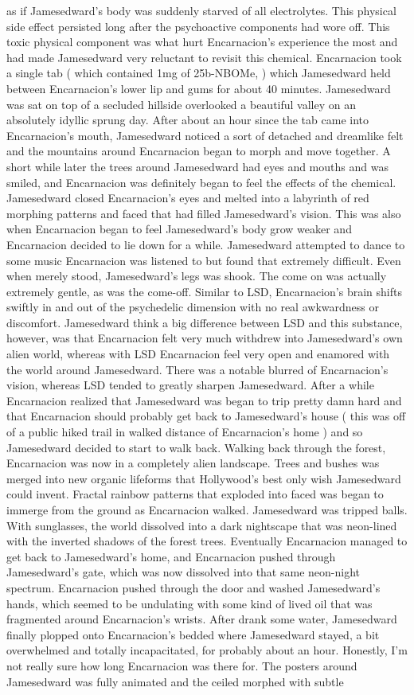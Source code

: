\documentclass[12pt]{book}
\begin{document}
as if Jamesedward's body was suddenly starved of all electrolytes. This physical side effect persisted long after the psychoactive components had wore off. This toxic physical component was what hurt Encarnacion's experience the most and had made Jamesedward very reluctant to revisit this chemical. Encarnacion took a single tab ( which contained 1mg of 25b-NBOMe, ) which Jamesedward held between Encarnacion's lower lip and gums for about 40 minutes. Jamesedward was sat on top of a secluded hillside overlooked a beautiful valley on an absolutely idyllic sprung day. After about an hour since the tab came into Encarnacion's mouth, Jamesedward noticed a sort of detached and dreamlike felt and the mountains around Encarnacion began to morph and move together. A short while later the trees around Jamesedward had eyes and mouths and was smiled, and Encarnacion was definitely began to feel the effects of the chemical. Jamesedward closed Encarnacion's eyes and melted into a labyrinth of red morphing patterns and faced that had filled Jamesedward's vision. This was also when Encarnacion began to feel Jamesedward's body grow weaker and Encarnacion decided to lie down for a while. Jamesedward attempted to dance to some music Encarnacion was listened to but found that extremely difficult. Even when merely stood, Jamesedward's legs was shook. The come on was actually extremely gentle, as was the come-off. Similar to LSD, Encarnacion's brain shifts swiftly in and out of the psychedelic dimension with no real awkwardness or discomfort. Jamesedward think a big difference between LSD and this substance, however, was that Encarnacion felt very much withdrew into Jamesedward's own alien world, whereas with LSD Encarnacion feel very open and enamored with the world around Jamesedward. There was a notable blurred of Encarnacion's vision, whereas LSD tended to greatly sharpen Jamesedward. After a while Encarnacion realized that Jamesedward was began to trip pretty damn hard and that Encarnacion should probably get back to Jamesedward's house ( this was off of a public hiked trail in walked distance of Encarnacion's home ) and so Jamesedward decided to start to walk back. Walking back through the forest, Encarnacion was now in a completely alien landscape. Trees and bushes was merged into new organic lifeforms that Hollywood's best only wish Jamesedward could invent. Fractal rainbow patterns that exploded into faced was began to immerge from the ground as Encarnacion walked. Jamesedward was tripped balls. With sunglasses, the world dissolved into a dark nightscape that was neon-lined with the inverted shadows of the forest trees. Eventually Encarnacion managed to get back to Jamesedward's home, and Encarnacion pushed through Jamesedward's gate, which was now dissolved into that same neon-night spectrum. Encarnacion pushed through the door and washed Jamesedward's hands, which seemed to be undulating with some kind of lived oil that was fragmented around Encarnacion's wrists. After drank some water, Jamesedward finally plopped onto Encarnacion's bedded where Jamesedward stayed, a bit overwhelmed and totally incapacitated, for probably about an hour. Honestly, I'm not really sure how long Encarnacion was there for. The posters around Jamesedward was fully animated and the ceiled morphed with subtle 
\end{document}
